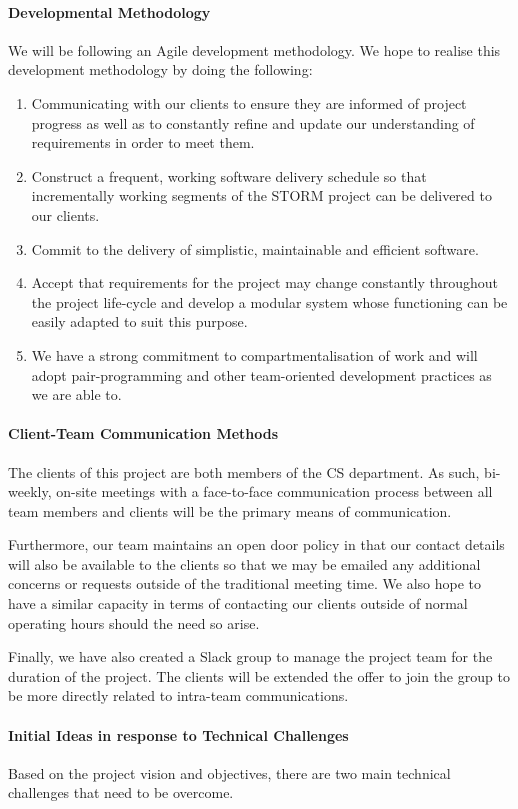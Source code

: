 \documentclass[12pt]{article}
\begin{document}
\paragraph{Developmental Methodology}
We will be following an Agile development methodology. We hope to realise this development methodology by doing the following:
\begin{enumerate}
\item Communicating with our clients to ensure they are informed of project progress as well as to constantly refine and update our understanding of requirements in order to meet them.
\item Construct a frequent, working software delivery schedule so that incrementally working segments of the STORM project can be delivered to our clients.
\item Commit to the delivery of simplistic, maintainable and efficient software.
\item Accept that requirements for the project may change constantly throughout the project life-cycle and develop a modular system whose functioning can be easily adapted to suit this purpose.
\item We have a strong commitment to compartmentalisation of work and will adopt pair-programming and other team-oriented development practices as we are able to.
\end{enumerate}

\paragraph{Client-Team Communication Methods}
The clients of this project are both members of the CS department. As such, bi-weekly, on-site meetings with a face-to-face communication process between all team members and clients will be the primary means of communication.

Furthermore, our team maintains an open door policy in that our contact details will also be available to the clients so that we may be emailed any additional concerns or requests outside of the traditional meeting time. We also hope to have a similar capacity in terms of contacting our clients outside of normal operating hours should the need so arise.

Finally, we have also created a Slack group to manage the project team for the duration of the project. The clients will be extended the offer to join the group to be more directly related to intra-team communications.
\paragraph{Initial Ideas in response to Technical Challenges}
Based on the project vision and objectives, there are two main technical challenges that need to be overcome.
\end{document}
